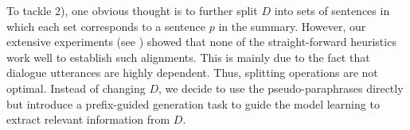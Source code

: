 To tackle 2), one obvious thought is to further split $D$ into sets of sentences
in which each set corresponds to a sentence $p$ in the summary.
However, our extensive experiments (see ) showed that none of the 
straight-forward heuristics work well to establish such alignments.
This is mainly due to the fact that dialogue utterances are highly dependent. Thus, splitting operations are not optimal.
Instead of changing $D$, we decide to use the pseudo-paraphrases
directly but introduce a prefix-guided generation task to guide the model
learning to extract relevant information from $D$.

%
%

